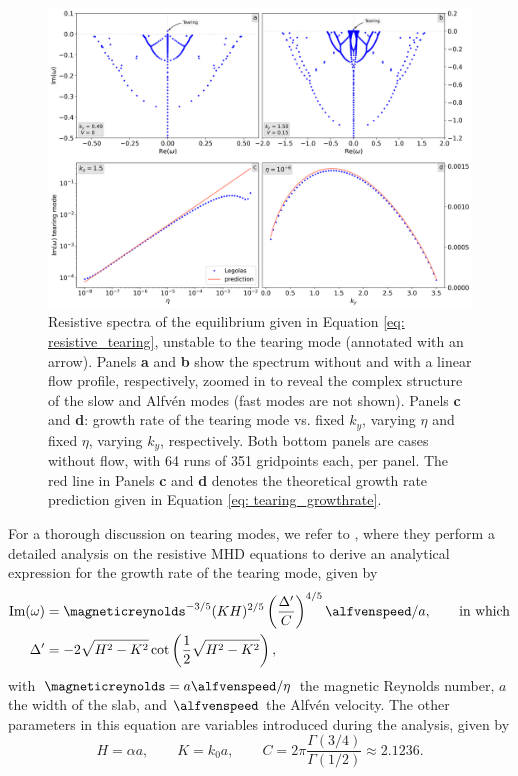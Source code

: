 \begin{figure}[t]
  \centering
  \includegraphics[width=\textwidth]{resistive_tearing.png}
  \caption{
    Resistive spectra of the equilibrium given in Equation \eqref{eq: resistive_tearing}, unstable to the tearing mode (annotated with an arrow). Panels \textbf{a} and \textbf{b} show the spectrum without and with a linear flow profile, respectively, zoomed in to reveal the complex structure of the slow and Alfv\'en modes (fast modes are not shown). Panels \textbf{c} and \textbf{d}: growth rate of the tearing mode vs. fixed $k_y$, varying $\eta$ and fixed $\eta$, varying $k_y$, respectively. Both bottom panels are cases without flow, with 64 runs of 351 gridpoints each, per panel. The red line in Panels \textbf{c} and \textbf{d} denotes the theoretical growth rate prediction given in Equation \eqref{eq: tearing_growthrate}.
  }
  \label{fig: resistive_tearing}
\end{figure}

For a thorough discussion on tearing modes, we refer to \citet{book_MHD}, where they perform a detailed analysis on the resistive MHD equations to derive an analytical expression for the growth rate of the tearing mode, given by
\begin{equation} \label{eq: tearing_growthrate}
  \begin{aligned}
    \text{Im}(\omega) &= \magneticreynolds^{-3/5}(KH)^{2/5}\left(\frac{\Delta'}{C}\right)^{4/5}\alfvenspeed / a,
    \qquad
    \text{in which} \\
    \Delta' &= -2\sqrt{H^2 - K^2}\cot\left(\frac{1}{2}\sqrt{H^2 - K^2}\right),
  \end{aligned}
\end{equation}
with $\magneticreynolds = a \alfvenspeed / \eta$ the magnetic Reynolds number, $a$ the width of the slab, and $\alfvenspeed$ the Alfv\'en velocity. The other parameters in this equation are variables introduced during the analysis, given by
\begin{equation}
  H = \alpha a,
  \qquad
  K = k_0 a,
  \qquad
  C = 2\pi\frac{\Gamma(3/4)}{\Gamma(1/2)} \approx 2.1236.
\end{equation}

